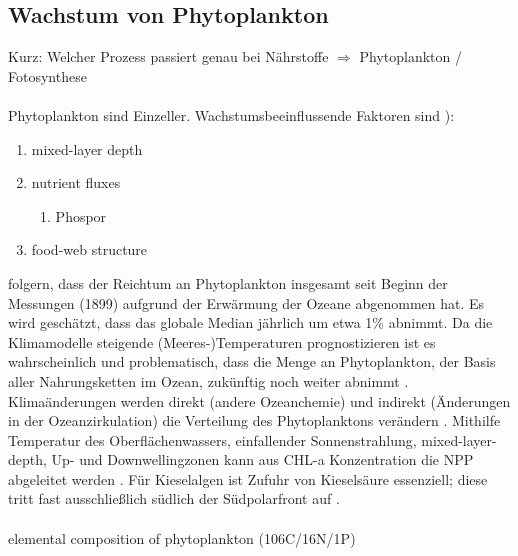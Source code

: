 \documentclass[12pt,a4paper,onecolumn]{scrartcl}
\begin{document}
\subsection{Wachstum von Phytoplankton}
Kurz: Welcher Prozess passiert genau bei Nährstoffe $\Rightarrow$ Phytoplankton / Fotosynthese \\\\
Phytoplankton sind Einzeller.
Wachstumsbeeinflussende Faktoren sind \citep{Falkowski.1998}):
\begin{enumerate}
\item mixed-layer depth
\item nutrient fluxes
\begin{enumerate}
\item Phospor \citep{REDFIELD.1960}
\end{enumerate}
\item food-web structure
\end{enumerate}
\citet{Boyce.2010} folgern, dass der Reichtum an Phytoplankton insgesamt seit Beginn der Messungen (1899) aufgrund der Erwärmung der Ozeane abgenommen hat. Es wird geschätzt, dass das globale Median jährlich um etwa 1\% abnimmt. Da die Klimamodelle steigende (Meeres-)Temperaturen prognostizieren ist es wahrscheinlich und problematisch, dass die Menge an Phytoplankton, der Basis aller Nahrungsketten im Ozean, zukünftig noch weiter abnimmt \citep{Siegel.2010}. Klimaänderungen werden direkt (andere Ozeanchemie) und indirekt (Änderungen in der Ozeanzirkulation) die Verteilung des Phytoplanktons verändern \citep{Falkowski.1998}. Mithilfe Temperatur des Oberflächenwassers, einfallender Sonnenstrahlung, mixed-layer-depth, Up- und Downwellingzonen kann aus CHL-a Konzentration die NPP abgeleitet werden \citep{Falkowski.1998}. Für Kieselalgen ist Zufuhr von Kieselsäure essenziell; diese tritt fast ausschließlich südlich der Südpolarfront auf \citep{Falkowski.1998}.
\\\\
elemental composition of phytoplankton (106C/16N/1P) \citep{Falkowski.1998}
\end{document}

